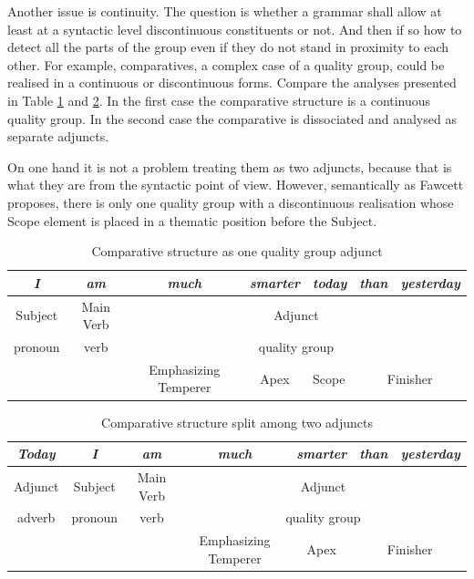 	Another issue is continuity. The question is whether a grammar shall allow at least at a syntactic level discontinuous constituents or not. And then if so how to detect all the parts of the group even if they do not stand in proximity to each other. For example, comparatives, a complex case of a quality group, could be realised in a continuous or discontinuous forms. Compare the analyses presented in Table \ref{tab:csgq1} and \ref{tab:csgq2}. In the first case the comparative structure is a continuous quality group. In the second case the comparative is dissociated and analysed as separate adjuncts. 
	
	On one hand it is not a problem treating them as two adjuncts, because that is what they are from the syntactic point of view. However, semantically as Fawcett proposes, there is only one quality group with a discontinuous realisation whose Scope element is placed in a thematic position before the Subject. 
    
	\begin{table}[H]
		\centering
		\begin{tabular}{|c|c|c|c|l|c|c|}
			\hline
			\textit{I} & \textit{am} & \textit{much} & \textit{smarter} & \textit{today} & \textit{than} & \textit{yesterday} \\ \hline
			Subject & Main Verb & \multicolumn{5}{c|}{Adjunct} \\ \hline
			pronoun & verb & \multicolumn{5}{c|}{quality group} \\ \hline
			&  & Emphasizing Temperer & Apex & Scope & \multicolumn{2}{c|}{Finisher} \\ \hline
		\end{tabular}
		\caption{Comparative structure as one quality group adjunct}
		\label{tab:csgq1}
	\end{table}
	\begin{table}[H]
		\centering
		\begin{tabular}{|c|c|c|c|c|c|c|}
			\hline
			\textit{Today} & \textit{I} & \textit{am} & \textit{much} & \textit{smarter} & \textit{than} & \textit{yesterday} \\ \hline
			Adjunct & Subject & Main Verb & \multicolumn{4}{c|}{Adjunct} \\ \hline
			adverb & pronoun & verb & \multicolumn{4}{c|}{quality group} \\ \hline
			&  &  & Emphasizing Temperer & Apex & \multicolumn{2}{c|}{Finisher} \\ \hline
		\end{tabular}
		\caption{Comparative structure split among two adjuncts}
		\label{tab:csgq2}
	\end{table}
    

